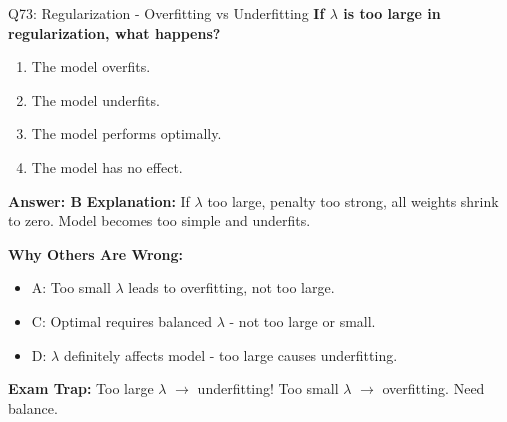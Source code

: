 \documentclass[8pt]{beamer}
\begin{document}
	\begin{frame}{Q73: Regularization - Overfitting vs Underfitting}
		\fontsize{6.5}{7.5}\selectfont
		\textbf{If $\lambda$ is too large in regularization, what happens?}
		
		\begin{enumerate}
			\item The model overfits.
			\item The model underfits.
			\item The model performs optimally.
			\item The model has no effect.
		\end{enumerate}
		
		\vspace{0.05cm}
		\textcolor{myblue}{\textbf{Answer: B}}
		\vspace{0.05cm}
		\textcolor{myblue}{\textbf{Explanation:}} If $\lambda$ too large, penalty too strong, all weights shrink to zero. Model becomes too simple and underfits.
		
		\vspace{0.05cm}
		\textcolor{myred}{\textbf{Why Others Are Wrong:}}
		\begin{itemize}
			\item \textcolor{myred}{A:} Too small $\lambda$ leads to overfitting, not too large.
			\item \textcolor{myred}{C:} Optimal requires balanced $\lambda$ - not too large or small.
			\item \textcolor{myred}{D:} $\lambda$ definitely affects model - too large causes underfitting.
		\end{itemize}
		
		\textcolor{myred}{\textbf{Exam Trap:}} Too large $\lambda$ $\rightarrow$ \textcolor{myred}{underfitting}! Too small $\lambda$ $\rightarrow$ overfitting. Need balance.
	\end{frame}
	
\end{document}
